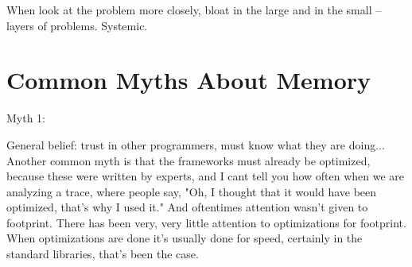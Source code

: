   


When look at the problem more closely, bloat in the large and in the small -- layers of problems.  Systemic.


\section{Common Myths About Memory}



Myth 1:

General belief:  trust in other programmers, must know what they are doing...
Another common myth is that the frameworks must already be optimized, because these were written by experts, and I cant tell you how often when we are analyzing a trace, where people say, "Oh, I thought that it would have been optimized, that's why I used it." And oftentimes attention wasn't given to footprint. There has been very, very little attention to optimizations for footprint.  When optimizations are done it's usually done for speed, certainly in the standard libraries, that's been the case.

